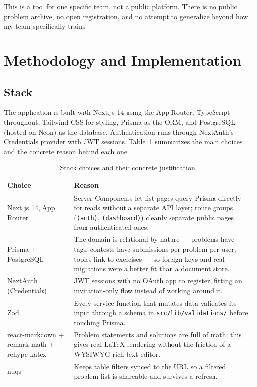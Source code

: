 \documentclass[11pt]{article}
\begin{document}
This is a tool for one specific team, not a public platform. There is no public problem archive, no open registration, and no attempt to generalize beyond how my team specifically trains.

\section{Methodology and Implementation}

\subsection{Stack}

The application is built with Next.js 14 using the App Router, TypeScript throughout, Tailwind CSS for styling, Prisma as the ORM, and PostgreSQL (hosted on Neon) as the database. Authentication runs through NextAuth's Credentials provider with JWT sessions. Table~\ref{tab:stack} summarizes the main choices and the concrete reason behind each one.

\begin{table}[h]
\centering
\begin{tabular}{@{}p{4cm}p{9.5cm}@{}}
\toprule
\textbf{Choice} & \textbf{Reason} \\
\midrule
Next.js 14, App Router & Server Components let list pages query Prisma directly for reads without a separate API layer; route groups (\texttt{(auth)}, \texttt{(dashboard)}) cleanly separate public pages from authenticated ones. \\
Prisma + PostgreSQL & The domain is relational by nature --- problems have tags, contests have submissions per problem per user, topics link to exercises --- so foreign keys and real migrations were a better fit than a document store. \\
NextAuth (Credentials) & JWT sessions with no OAuth app to register, fitting an invitation-only flow instead of working around it. \\
Zod & Every service function that mutates data validates its input through a schema in \texttt{src/lib/validations/} before touching Prisma. \\
react-markdown + remark-math + rehype-katex & Problem statements and solutions are full of math; this gives real LaTeX rendering without the friction of a WYSIWYG rich-text editor. \\
nuqs & Keeps table filters synced to the URL so a filtered problem list is shareable and survives a refresh. \\
\bottomrule
\end{tabular}
\caption{Stack choices and their concrete justification.}
\label{tab:stack}
\end{table}
\end{document}
